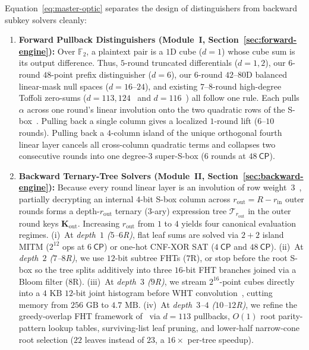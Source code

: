 \documentclass[11pt,a4paper]{article}
\theoremstyle{definition}
\theoremstyle{remark}
\newcommand{\Ftwo}{\mathbb{F}_2}
\newcommand{\CP}{\mathsf{CP}}
\begin{document}
Equation~\eqref{eq:master-optic} separates the design of distinguishers from backward subkey solvers cleanly:
\begin{enumerate}[leftmargin=1.8em]
    \item \textbf{Forward Pullback Distinguishers (Module~I, Section~\ref{sec:forward-engine}):} Over $\Ftwo$, a plaintext pair is a $1$D cube ($d = 1$) whose cube sum is its output difference. Thus, $5$-round truncated differentials ($d = 1, 2$), our $6$-round $48$-point prefix distinguisher ($d = 6$), our $6$-round $42$--$80$D balanced linear-mask null spaces ($d = 16$--$24$), and existing $7$--$8$-round high-degree Toffoli zero-sums ($d = 113, 124$~\cite{BRRT25,KKL24} and $d = 116$~\cite{DG25}) all follow one rule. Each pulls $\alpha$ across one round's linear involution onto the two quadratic rows of the S-box~\cite{BRRT25}. Pulling back a single column gives a localized $1$-round lift ($6$--$10$ rounds). Pulling back a $4$-column island of the unique orthogonal fourth linear layer cancels all cross-column quadratic terms and collapses two consecutive rounds into one degree-$3$ super-S-box ($6$ rounds at $48~\CP$).
    \item \textbf{Backward Ternary-Tree Solvers (Module~II, Section~\ref{sec:backward-engine}):} Because every round linear layer is an involution of row weight~$3$~\cite{GMW24}, partially decrypting an internal $4$-bit S-box column across $r_{\text{out}} = R - r_{\text{in}}$ outer rounds forms a depth-$r_{\text{out}}$ ternary ($3$-ary) expression tree $\mathcal{T}_{r_{\text{out}}}$ in the outer round keys $\mathbf{K}_{\text{out}}$. Increasing $r_{\text{out}}$ from $1$ to $4$ yields four canonical evaluation regimes. (i)~At \emph{depth~$1$ ($5$--$6$R)}, flat leaf sums are solved via $2+2$ island MITM ($2^{12}$ ops at $6~\CP$) or one-hot CNF-XOR SAT ($4~\CP$ and $48~\CP$). (ii)~At \emph{depth~$2$ ($7$--$8$R)}, we use $12$-bit subtree FHTs ($7$R), or stop before the root S-box so the tree splits additively into three $16$-bit FHT branches joined via a Bloom filter ($8$R). (iii)~At \emph{depth~$3$ ($9$R)}, we stream $2^{16}$-point cubes directly into a $4\text{ KB}$ $12$-bit joint histogram before WHT convolution~\cite{DGK24,DG25}, cutting memory from $256\text{ GB}$ to $4.7\text{ MB}$. (iv)~At \emph{depth~$3$--$4$ ($10$--$12$R)}, we refine the greedy-overlap FHT framework of~\cite{DG25} via $d = 113$ pullbacks, $O(1)$ root parity-pattern lookup tables, surviving-list leaf pruning, and lower-half narrow-cone root selection ($22$ leaves instead of $23$, a $16\times$ per-tree speedup).
\end{enumerate}
\end{document}
